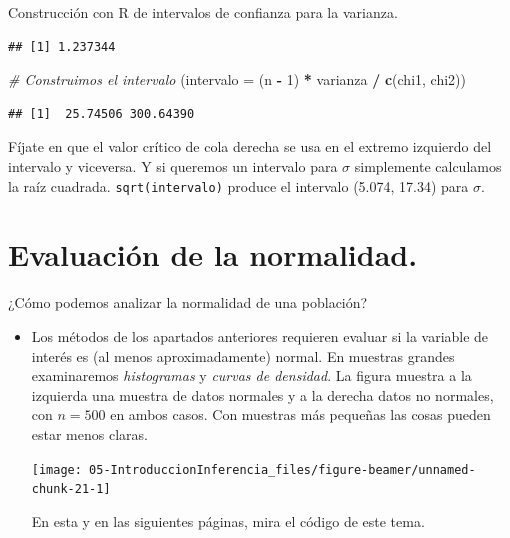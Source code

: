\documentclass[
  9pt,
  ignorenonframetext,
]{beamer}
\newenvironment{Shaded}{\begin{snugshade}}{\end{snugshade}}
\newcommand{\CommentTok}[1]{\textcolor[rgb]{0.56,0.35,0.01}{\textit{#1}}}
\newcommand{\DataTypeTok}[1]{\textcolor[rgb]{0.13,0.29,0.53}{#1}}
\newcommand{\DecValTok}[1]{\textcolor[rgb]{0.00,0.00,0.81}{#1}}
\newcommand{\KeywordTok}[1]{\textcolor[rgb]{0.13,0.29,0.53}{\textbf{#1}}}
\newcommand{\NormalTok}[1]{#1}
\newcommand{\OperatorTok}[1]{\textcolor[rgb]{0.81,0.36,0.00}{\textbf{#1}}}
\newcommand{\StringTok}[1]{\textcolor[rgb]{0.31,0.60,0.02}{#1}}
\begin{document}
\begin{frame}[fragile]{Construcción con R de intervalos de confianza
para la varianza.}
\begin{itemize}
\begin{verbatim}
## [1] 1.237344
\end{verbatim}

\begin{Shaded}
\begin{Highlighting}[]
\CommentTok{# Construimos el intervalo}
\NormalTok{(}\DataTypeTok{intervalo =}\NormalTok{ (n }\OperatorTok{-}\StringTok{ }\DecValTok{1}\NormalTok{) }\OperatorTok{*}\StringTok{ }\NormalTok{varianza }\OperatorTok{/}\StringTok{ }\KeywordTok{c}\NormalTok{(chi1, chi2))}
\end{Highlighting}
\end{Shaded}

\begin{verbatim}
## [1]  25.74506 300.64390
\end{verbatim}

  \normalsize Fíjate en que el valor crítico de cola derecha se usa en
  el extremo izquierdo del intervalo y viceversa. Y si queremos un
  intervalo para \(\sigma\) simplemente calculamos la raíz cuadrada.
  \texttt{sqrt(intervalo)} produce el intervalo (5.074, 17.34) para
  \(\sigma\).
\end{itemize}

\end{frame}

\hypertarget{evaluacion-de-la-normalidad.}{%
\section{Evaluación de la
normalidad.}\label{evaluacion-de-la-normalidad.}}

\begin{frame}{¿Cómo podemos analizar la normalidad de una población?}
\protect\hypertarget{como-podemos-analizar-la-normalidad-de-una-poblacion}{}

\begin{itemize}
\item
  Los métodos de los apartados anteriores requieren evaluar si la
  variable de interés es (al menos aproximadamente) normal. En muestras
  grandes examinaremos \emph{histogramas} y \emph{curvas de densidad}.
  La figura muestra a la izquierda una muestra de datos normales y a la
  derecha datos no normales, con \(n = 500\) en ambos casos. Con
  muestras más pequeñas las cosas pueden estar menos claras.

  \begin{center}\texttt{[image: 05-IntroduccionInferencia\_files/figure-beamer/unnamed-chunk-21-1]} \end{center}

  En esta y en las siguientes páginas, mira el código de este tema.
\end{itemize}

\end{frame}
\end{document}
